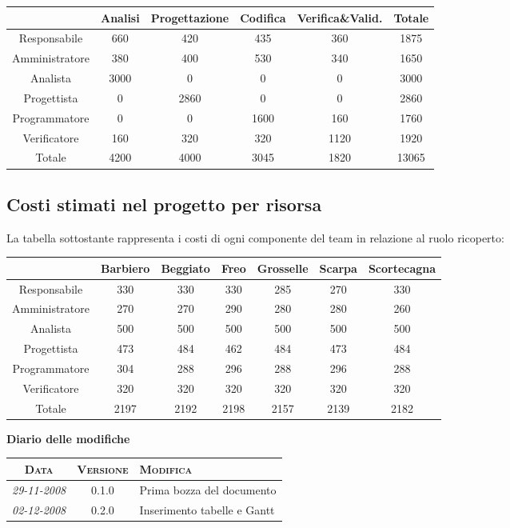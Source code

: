 \documentclass[11pt,a4paper]{article}
\newcommand{\modifiche} 
{
\newpage
\begin{center}
\textbf{Diario delle modifiche} \\
\bigskip
\begin{tabular}{|c|c|p{0.69\textwidth}|}
\hline
\textsc{Data} & \textsc{Versione} & \textsc{Modifica} \\
\hline
\hline
\textit{29-11-2008} & 0.1.0 & Prima bozza del documento \\
\hline
\hline
\textit{02-12-2008} & 0.2.0 & Inserimento tabelle e Gantt \\
\hline
\end{tabular}
\end{center}
}
\begin{document}
\begin{tabular}{|c|c|c|c|c|c|}
\hline
 & Analisi & Progettazione & Codifica & Verifica\&Valid. & Totale \\ \hline
Responsabile & 660 & 420 & 435 & 360 & 1875 \\ \hline
Amministratore & 380 & 400 & 530 & 340 & 1650 \\ \hline
Analista & 3000 & 0 & 0 & 0 & 3000 \\ \hline
Progettista & 0 & 2860 & 0 & 0 & 2860 \\ \hline
Programmatore & 0 & 0 & 1600 & 160 & 1760 \\ \hline
Verificatore & 160 & 320 & 320 & 1120 & 1920 \\ \hline
Totale & 4200 & 4000 & 3045 & 1820 & 13065 \\ \hline
\end{tabular}

\subsection{Costi stimati nel progetto per risorsa}
La tabella sottostante rappresenta i costi di ogni componente del team in relazione al ruolo ricoperto:\\

\begin{tabular}{|c|c|c|c|c|c|c|}
\hline
\multicolumn{1}{|l|}{} & \multicolumn{1}{l|}{        Barbiero} & \multicolumn{1}{l|}{          Beggiato} & \multicolumn{1}{l|}{              Freo} & \multicolumn{1}{l|}{               Grosselle} & \multicolumn{1}{l|}{          Scarpa} & \multicolumn{1}{l|}{  Scortecagna} \\ \hline
Responsabile & 330 & 330 & 330 & 285 & 270 & 330 \\ \hline
Amministratore & 270 & 270 & 290 & 280 & 280 & 260 \\ \hline
Analista & 500 & 500 & 500 & 500 & 500 & 500 \\ \hline
Progettista & 473 & 484 & 462 & 484 & 473 & 484 \\ \hline
Programmatore & 304 & 288 & 296 & 288 & 296 & 288 \\ \hline
Verificatore & 320 & 320 & 320 & 320 & 320 & 320 \\ \hline
Totale & 2197 & 2192 & 2198 & 2157 & 2139 & 2182 \\ \hline
\end{tabular}

\modifiche
\end{document}
